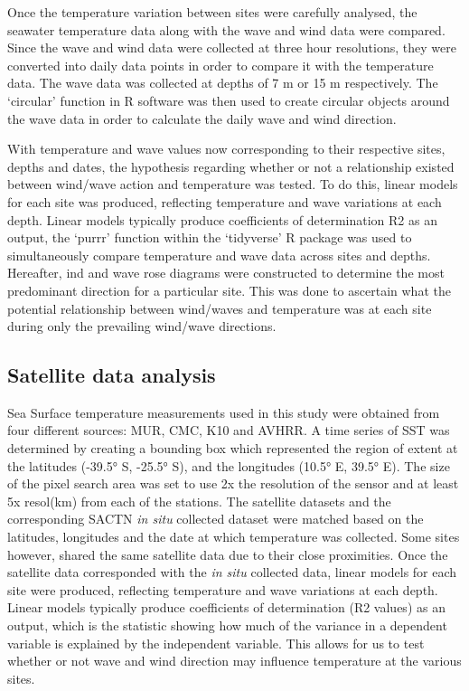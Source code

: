 \documentclass[12pt,]{article}
\begin{document}
Once the temperature variation between sites were carefully analysed,
the seawater temperature data along with the wave and wind data were
compared. Since the wave and wind data were collected at three hour
resolutions, they were converted into daily data points in order to
compare it with the temperature data. The wave data was collected at
depths of 7 m or 15 m respectively. The `circular' function in R
software was then used to create circular objects around the wave data
in order to calculate the daily wave and wind direction.

With temperature and wave values now corresponding to their respective
sites, depths and dates, the hypothesis regarding whether or not a
relationship existed between wind/wave action and temperature was
tested. To do this, linear models for each site was produced, reflecting
temperature and wave variations at each depth. Linear models typically
produce coefficients of determination R2 as an output, the `purrr'
function within the `tidyverse' R package was used to simultaneously
compare temperature and wave data across sites and depths. Hereafter,
ind and wave rose diagrams were constructed to determine the most
predominant direction for a particular site. This was done to ascertain
what the potential relationship between wind/waves and temperature was
at each site during only the prevailing wind/wave directions.

\subsection{Satellite data analysis}\label{satellite-data-analysis}

Sea Surface temperature measurements used in this study were obtained
from four different sources: MUR, CMC, K10 and AVHRR. A time series of
SST was determined by creating a bounding box which represented the
region of extent at the latitudes (-39.5° S, -25.5° S), and the
longitudes (10.5° E, 39.5° E). The size of the pixel search area was set
to use 2x the resolution of the sensor and at least 5x resol(km) from
each of the stations. The satellite datasets and the corresponding SACTN
\emph{in situ} collected dataset were matched based on the latitudes,
longitudes and the date at which temperature was collected. Some sites
however, shared the same satellite data due to their close proximities.
Once the satellite data corresponded with the \emph{in situ} collected
data, linear models for each site were produced, reflecting temperature
and wave variations at each depth. Linear models typically produce
coefficients of determination (R2 values) as an output, which is the
statistic showing how much of the variance in a dependent variable is
explained by the independent variable. This allows for us to test
whether or not wave and wind direction may influence temperature at the
various sites.
\end{document}
